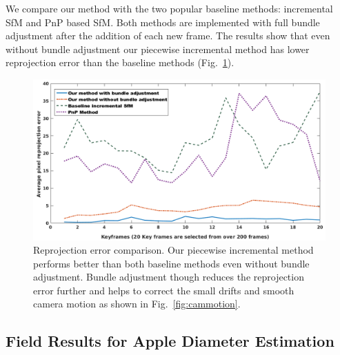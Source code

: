         



We compare our method with the two popular baseline methods: incremental SfM and PnP based SfM. Both methods are implemented with full bundle adjustment after the addition of each new frame. The results show that even without bundle adjustment our piecewise incremental method has lower reprojection error than the baseline methods (Fig.~\ref{fig:reprojmultiple}).


\begin{figure}[!h]
\centering
\includegraphics[width=\textwidth]{figures/isfm/reprojmultiple2.png}
\caption[Reprojection error for our method with and without bundle adjustment, baseline incremental structure from motion (SfM) and PnP based SfM.]{Reprojection error comparison. Our piecewise incremental method performs better than both baseline methods even without bundle adjustment. Bundle adjustment though reduces the reprojection error further and helps to correct the small drifts and smooth camera motion as shown in Fig.~\ref{fig:cammotion}.
\label{fig:reprojmultiple}}
\end{figure}


\subsection{Field Results for Apple Diameter Estimation}
\label{subsec:evalest}

